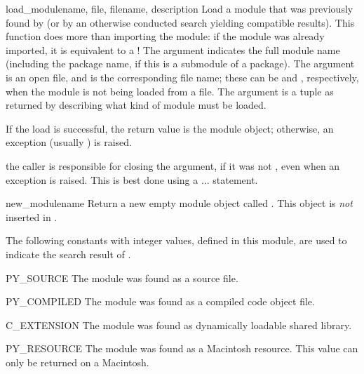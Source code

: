 \begin{funcdesc}{load_module}{name, file, filename, description}
Load a module that was previously found by  (or by
an otherwise conducted search yielding compatible results).  This
function does more than importing the module: if the module was
already imported, it is equivalent to a
!  The
 argument indicates the full module name (including the
package name, if this is a submodule of a package).  The 
argument is an open file, and  is the corresponding
file name; these can be  and , respectively, when
the module is not being loaded from a file.  The 
argument is a tuple as returned by  describing
what kind of module must be loaded.

If the load is successful, the return value is the module object;
otherwise, an exception (usually ) is raised.

 the caller is responsible for closing the
 argument, if it was not , even when an exception
is raised.  This is best done using a 
...  statement.
\end{funcdesc}

\begin{funcdesc}{new_module}{name}
Return a new empty module object called .  This object is
\emph{not} inserted in .
\end{funcdesc}

The following constants with integer values, defined in this module,
are used to indicate the search result of .

\begin{datadesc}{PY_SOURCE}
The module was found as a source file.
\end{datadesc}

\begin{datadesc}{PY_COMPILED}
The module was found as a compiled code object file.
\end{datadesc}

\begin{datadesc}{C_EXTENSION}
The module was found as dynamically loadable shared library.
\end{datadesc}

\begin{datadesc}{PY_RESOURCE}
The module was found as a Macintosh resource.  This value can only be
returned on a Macintosh.
\end{datadesc}

